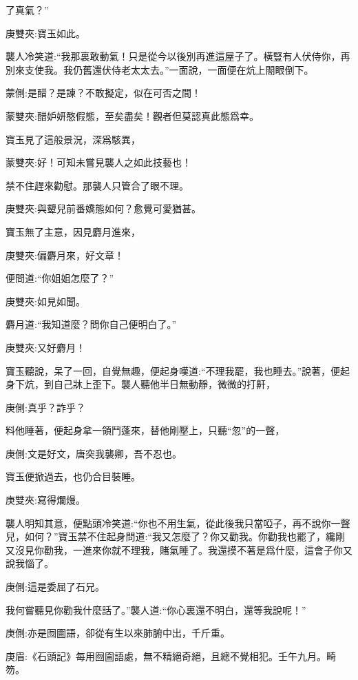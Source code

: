\begin{parag}
了真氣？”\begin{note}庚雙夾:寶玉如此。\end{note}襲人冷笑道:“我那裏敢動氣！只是從今以後別再進這屋子了。橫豎有人伏侍你，再別來支使我。我仍舊還伏侍老太太去。”一面說，一面便在炕上閤眼倒下。\begin{note}蒙側:是醋？是諫？不敢擬定，似在可否之間！\end{note}\begin{note}蒙雙夾:醋妒妍憨假態，至矣盡矣！觀者但莫認真此態爲幸。\end{note}寶玉見了這般景況，深爲駭異，\begin{note}蒙雙夾:好！可知未嘗見襲人之如此技藝也！\end{note}禁不住趕來勸慰。那襲人只管合了眼不理。\begin{note}庚雙夾:與顰兒前番嬌態如何？愈覺可愛猶甚。\end{note}寶玉無了主意，因見麝月進來，\begin{note}庚雙夾:偏麝月來，好文章！\end{note}便問道:“你姐姐怎麼了？”\begin{note}庚雙夾:如見如聞。\end{note}麝月道:“我知道麼？問你自己便明白了。”\begin{note}庚雙夾:又好麝月！\end{note}寶玉聽說，呆了一回，自覺無趣，便起身嘆道:“不理我罷，我也睡去。”說著，便起身下炕，到自己牀上歪下。襲人聽他半日無動靜，微微的打鼾，\begin{note}庚側:真乎？詐乎？\end{note}料他睡著，便起身拿一領鬥蓬來，替他剛壓上，只聽“忽”的一聲，\begin{note}庚側:文是好文，唐突我襲卿，吾不忍也。\end{note}寶玉便掀過去，也仍合目裝睡。\begin{note}庚雙夾:寫得爛熳。\end{note}襲人明知其意，便點頭冷笑道:“你也不用生氣，從此後我只當啞子，再不說你一聲兒，如何？”寶玉禁不住起身問道:“我又怎麼了？你又勸我。你勸我也罷了，纔剛又沒見你勸我，一進來你就不理我，賭氣睡了。我還摸不著是爲什麼，這會子你又說我惱了。\begin{note}庚側:這是委屈了石兄。\end{note}我何嘗聽見你勸我什麼話了。”襲人道:“你心裏還不明白，還等我說呢！”\begin{note}庚側:亦是囫圇語，卻從有生以來肺腑中出，千斤重。\end{note}\begin{note}庚眉:《石頭記》每用囫圇語處，無不精絕奇絕，且總不覺相犯。壬午九月。畸笏。\end{note}
\end{parag}


